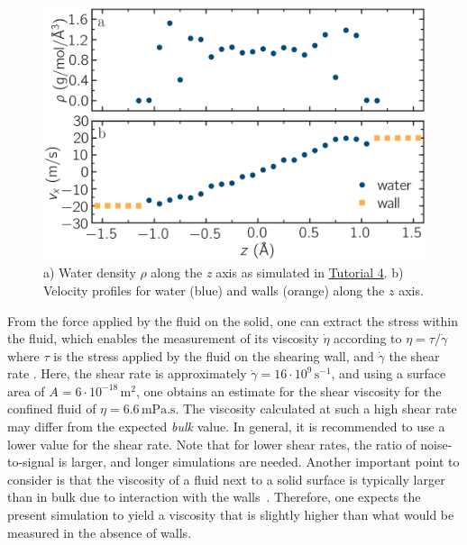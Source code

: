\documentclass[9pt,tutorial]{livecoms}
\begin{document}
\begin{figure}
\centering
\includegraphics[width=\linewidth]{NANOSHEAR-profiles}
\caption{a) Water density $\rho$ along the \textit{z} axis as
simulated in \hyperref[sheared-confined-label]{Tutorial 4}.
b) Velocity profiles for water (blue) and walls
(orange) along the $z$ axis.}
\label{fig:NANOSHEAR-profiles}
\end{figure}

From the force applied by the fluid on the solid, one can extract the stress
within the fluid, which enables the measurement of its viscosity $\dot{\eta}$
according to $\eta = \tau / \dot{\gamma}$ where $\tau$ is the stress applied by
the fluid on the shearing wall, and $\dot{\gamma}$ the shear rate
\cite{gravelle2021violations}.  Here, the shear rate is
approximately $\dot{\gamma} = 16 \cdot 10^9\,\text{s}^{-1}$, and using a
surface area of $A = 6 \cdot 10^{-18}\,\text{m}^2$, one obtains an estimate for
the shear viscosity for the confined fluid of $\eta = 6.6\,\text{mPa.s}$.  The
viscosity calculated at such a high shear rate may differ from the expected
\emph{bulk} value.  In general, it is recommended to use a lower value for the
shear rate.  Note that for lower shear rates, the ratio of noise-to-signal is
larger, and longer simulations are needed.  Another important point to consider
is that the viscosity of a fluid next to a solid surface is typically larger
than in bulk due to interaction with the walls~\cite{wolde-kidanInterplayInterfacialViscosity2021}.
Therefore, one expects the present simulation to yield a viscosity that is slightly
higher than what would be measured in the absence of walls.
\end{document}
